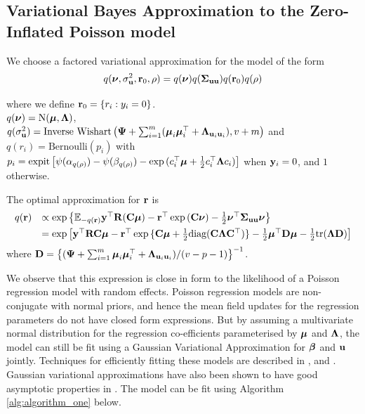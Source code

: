 \subsection{Variational Bayes Approximation to the Zero-Inflated Poisson model}

We choose a factored variational approximation for the model of the form 
\[
	q({\boldsymbol \nu}, \sigma_{{\bf u}}^2,{\bf r}_0, \rho) = q({\boldsymbol \nu}) q({\boldsymbol \Sigma}_{{\bf u} {\bf u}}) q({\bf r}_0) q(\rho)
\]

\noindent 
where we define ${\bf r}_0 = \{ r_i : y_i = 0 \}$. \\
$q({\boldsymbol \nu}) = \text{N}({\boldsymbol \mu}, {\boldsymbol \Lambda})$, \\
$q(\sigma_{{\bf u}}^2) = \text{Inverse Wishart}\left({\boldsymbol \Psi} + \sum_{i=1}^m ({\boldsymbol \mu}_i {\boldsymbol \mu}_i^\top + {\boldsymbol \Lambda}_{{\bf u}_i {\bf u}_i}), v + m \right)$ \mbox{and } \\
$q(r_i) = \text{Bernoulli}{(p_i)}$ with
$p_i = \text{expit}\left[ \psi{(\alpha_{q(\rho)})} - \psi{(\beta_{q(\rho)})} - \exp{(c_i^\top{\boldsymbol\mu}+ \frac{1}{2} c_i^\top {\boldsymbol\Lambda}c_i)} \right]$ when ${\bf y}_i = 0$, and $1$ otherwise.


The optimal approximation  for
${\bf r}$ is
\[
\begin{array}{rl}
	q({\bf r}) & \propto \exp \left \{ {\mathbb E}_{-q({\bf r})}{\bf y}^\top{\bf R}({\bf C}{\boldsymbol \mu}) - {\bf r}^\top\exp{({\bf C}{\boldsymbol\nu})}-\frac{1}{2} {\boldsymbol \nu}^\top {\boldsymbol\Sigma}_{{\bf u} {\bf u}} {\boldsymbol \nu} \right \}                                                  \\ [1ex]
	       & = \exp{ \left[ {\bf y}^\top{\bf R}{\bf C}{\boldsymbol\mu}- {\bf r}^\top \exp{\{{\bf C}{\boldsymbol\mu}+ \frac{1}{2} \text{diag}({\bf C}{\boldsymbol\Lambda}{\bf C}^\top)\}} - \frac{1}{2} {\boldsymbol\mu}^\top {\bf D}{\boldsymbol\mu}- \frac{1}{2} \text{tr}({\boldsymbol\Lambda}{\bf D}) \right] } 
\end{array}
\]
\noindent where ${\bf D} = \left\{ ({\boldsymbol \Psi} + \sum_{i=1}^m {\boldsymbol \mu}_i {\boldsymbol \mu}_i^\top + {\boldsymbol \Lambda}_{{\bf u}_i{\bf u}_i}) / (v - p - 1) \right\}^{-1}$. 

We observe that this expression is close in form to the likelihood of a Poisson regression model with random
effects. Poisson regression models are non-conjugate with normal priors, and hence the mean field updates for
the regression parameters do not have closed form expressions. But by assuming a multivariate normal
distribution for the regression co-efficients parameterised by ${\boldsymbol \mu}$ and ${\boldsymbol \Lambda}$, the model can still be
fit using a Gaussian Variational Approximation for ${\boldsymbol \beta}$ and ${\bf u}$ jointly. Techniques for efficiently
fitting these models are described in \cite{Ormerod2012}, \cite{Challis2013} and \cite{Opper2009}. Gaussian
variational approximations have also been shown to have good asymptotic properties in \cite{Sinica2017}. The
model can be fit using Algorithm \ref{alg:algorithm_one} below.

